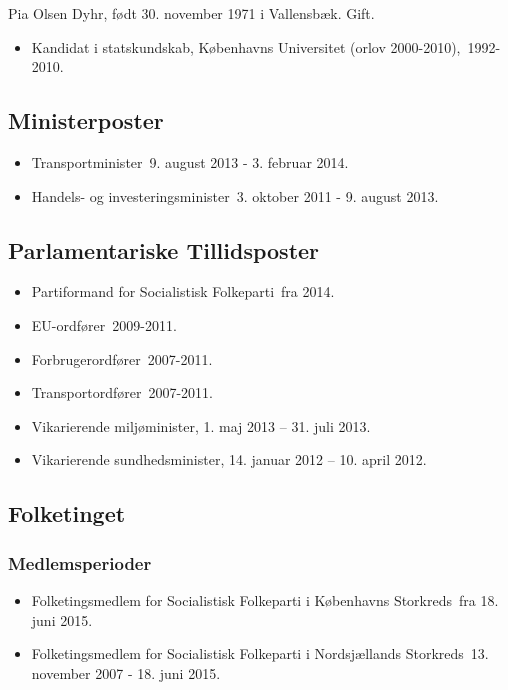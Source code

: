 \documentclass[11pt, a4paper]{awesome-cv}
\begin{document}
\makecvheader[R]
\makelettertitle
\begin{cvletter}
Pia Olsen Dyhr, født 30. november 1971 i Vallensbæk. Gift.

\begin{itemize}
\item Kandidat i statskundskab, Københavns Universitet (orlov 2000-2010), 1992-2010.
\end{itemize}
\subsection*{Ministerposter}
\begin{itemize}
\item Transportminister 9. august 2013 - 3. februar 2014.
\item Handels- og investeringsminister 3. oktober 2011 - 9. august 2013.
\end{itemize}
\subsection*{Parlamentariske Tillidsposter}
\begin{itemize}
\item Partiformand for Socialistisk Folkeparti fra 2014.
\item EU-ordfører 2009-2011.
\item Forbrugerordfører 2007-2011.
\item Transportordfører 2007-2011.
\item Vikarierende miljøminister, 1. maj 2013  –  31. juli 2013.
\item Vikarierende sundhedsminister, 14. januar 2012  – 10. april 2012.
\end{itemize}
\subsection*{Folketinget}
\subsubsection*{Medlemsperioder}
\begin{itemize}
\item Folketingsmedlem for Socialistisk Folkeparti i Københavns Storkreds fra 18. juni 2015.
\item Folketingsmedlem for Socialistisk Folkeparti i Nordsjællands Storkreds 13. november 2007 - 18. juni 2015.
\end{itemize}

\end{cvletter}
\end{document}
